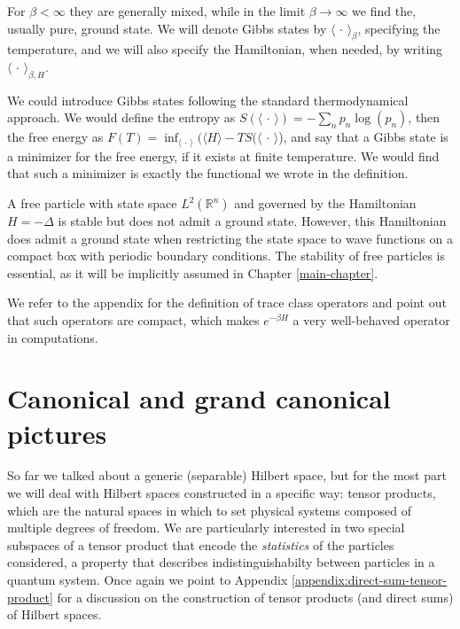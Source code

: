 For $\beta<\infty$ they are generally mixed, while in the limit $\beta\to\infty$ we find the,
usually pure, ground state. We will denote Gibbs states by $\langle\,\cdot\,\rangle_\beta$,
specifying the temperature, and we will also specify the Hamiltonian, when needed, by
writing $\langle\,\cdot\,\rangle_{\beta,H}$.
\begin{remark}
	We could introduce Gibbs states following the standard thermodynamical approach. We would
	define the entropy as $S(\langle\,\cdot\,\rangle) = -\sum_{n}p_n\log(p_n)$, then the free
	energy as $F(T) = \inf_{\langle\,\cdot\,\rangle}(\langle H\rangle - TS(\langle\,\cdot\,\rangle$),
	and say that a Gibbs state is a minimizer for the free energy, if it exists at finite
	temperature. We would find that such a minimizer is exactly the functional we wrote in the
	definition.
\end{remark}
\begin{remark}
	A free particle with state space $L^2(\mathbb{R}^n)$ and governed by the Hamiltonian
	$H=-\Delta$ is stable but does not admit a ground state. However, this Hamiltonian does
	admit a ground state when restricting the state space to wave functions on a compact
	box with periodic boundary conditions. The stability of free particles is essential,
	as it will be implicitly assumed in Chapter \ref{main-chapter}.
\end{remark}

We refer to the appendix for the definition of trace class operators and point out that such
operators are compact, which makes $e^{-\beta H}$ a very well-behaved operator in computations.

\section{Canonical and grand canonical pictures}
\label{canonical-grand-canonical}
So far we talked about a generic (separable) Hilbert space, but for the most part we will deal
with Hilbert spaces constructed in a specific way: tensor products, which are the natural
spaces in which to set physical systems composed of multiple degrees of freedom. We are
particularly interested in two special subspaces of a tensor product that encode the
\textit{statistics} of the particles considered, a property that describes indistinguishabilty
between particles in a quantum system. Once again we point to Appendix
\ref{appendix:direct-sum-tensor-product} for a discussion on the construction of tensor
products (and direct sums) of Hilbert spaces.

